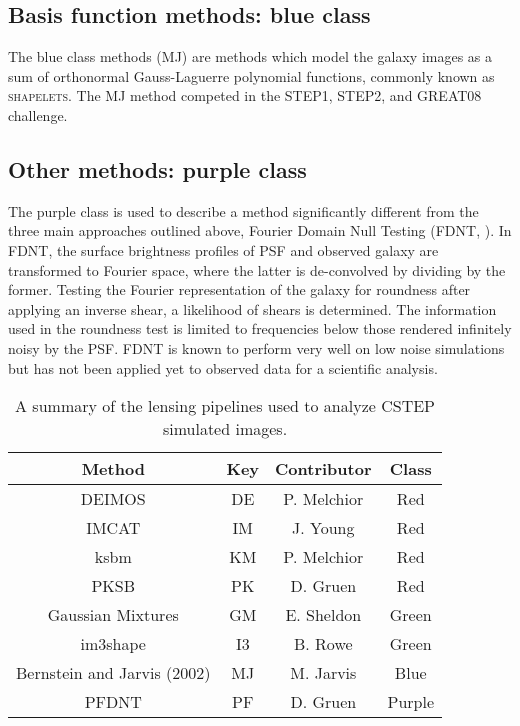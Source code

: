 \subsection{Basis function methods: blue class}
The blue class methods (MJ) are methods which model the
galaxy images as a sum of orthonormal Gauss-Laguerre polynomial
functions, commonly known as \textsc{shapelets}. The MJ
method competed in the STEP1, STEP2, and GREAT08 challenge. 


\subsection{Other methods: purple class}
The purple class is used to describe a method significantly different from the
three main approaches outlined above, Fourier Domain Null Testing (FDNT,
\citealt{Bern}). In FDNT, the surface brightness profiles of PSF and
observed galaxy are transformed to Fourier space, where the latter is
de-convolved by dividing by the former. Testing the Fourier
representation of the galaxy for roundness after applying an inverse
shear, a likelihood of shears is determined. The information used in
the roundness test is limited to frequencies below those rendered
infinitely noisy by the PSF. FDNT is known to perform very well on low
noise simulations \citep{Bern} but has not been applied yet to
observed data for a scientific analysis.
 
\begin{table}
\begin{center}
  \begin{tabular}{| c | c | c| c | }
    \hline 
     Method & Key & Contributor & Class \\
    \hline \hline
     DEIMOS & DE &  P. Melchior & Red  \\
    \hline
    IMCAT & IM & J. Young & Red  \\
    \hline
    ksbm &  KM & P. Melchior &  Red \\
    \hline
    PKSB & PK & D. Gruen & Red \\
    \hline
     Gaussian Mixtures & GM & E. Sheldon & Green \\
    \hline
     im3shape &  I3 &  B. Rowe & Green \\
    \hline
     Bernstein and Jarvis (2002) & MJ &  M. Jarvis & Blue \\
    \hline
     PFDNT &  PF & D. Gruen & Purple \\
    \hline
  \end{tabular}
\end{center}
\caption{ A summary of the lensing pipelines used to analyze CSTEP simulated images. }
\label{table:smp}
\end{table}
